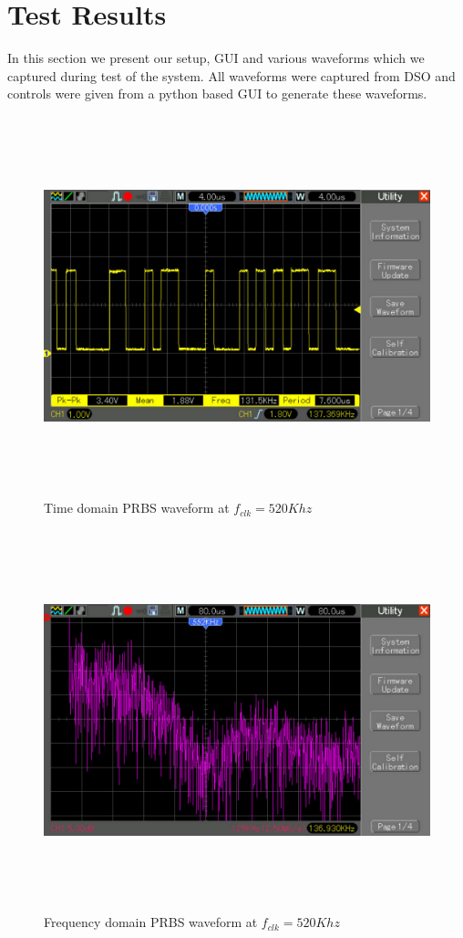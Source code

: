 \documentclass[a4paper,12pt]{article}
\begin{document}
\section{Test Results}
In this section we present our setup, GUI and various waveforms which we captured during test of the system. All waveforms were captured from DSO and controls were given from a python based GUI to generate these waveforms.

\begin{figure}[!ht]
	\centering
	\includegraphics[width=\linewidth,height=11cm]{pic_488_2.pdf}
	\caption{Time domain PRBS waveform at $f_{clk} = 520Khz$}
	\label{fig:result-2}
\end{figure}

\begin{figure}[!ht]
	\centering
	\includegraphics[width=\linewidth,height=11cm]{pic_488_3.pdf}
	\caption{Frequency domain PRBS waveform at $f_{clk} = 520Khz$}
		\label{fig:result-3}
\end{figure}
\end{document}
